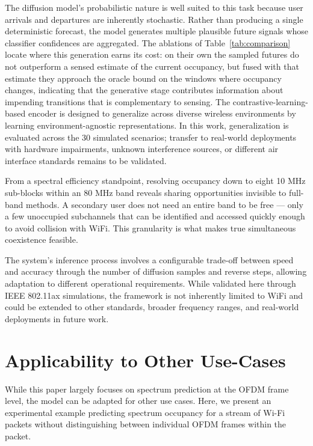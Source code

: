 \documentclass[lettersize,journal]{IEEEtran}
\begin{document}
The diffusion model's probabilistic nature is well suited to this task because user arrivals and departures are inherently stochastic. Rather than producing a single deterministic forecast, the model generates multiple plausible future signals whose classifier confidences are aggregated. The ablations of Table~\ref{tab:comparison} locate where this generation earns its cost: on their own the sampled futures do not outperform a sensed estimate of the current occupancy, but fused with that estimate they approach the oracle bound on the windows where occupancy changes, indicating that the generative stage contributes information about impending transitions that is complementary to sensing. The contrastive-learning-based encoder is designed to generalize across diverse wireless environments by learning environment-agnostic representations. In this work, generalization is evaluated across the 30 simulated scenarios; transfer to real-world deployments with hardware impairments, unknown interference sources, or different air interface standards remains to be validated.

From a spectral efficiency standpoint, resolving occupancy down to eight 10 MHz sub-blocks within an 80 MHz band reveals sharing opportunities invisible to full-band methods. A secondary user does not need an entire band to be free — only a few unoccupied subchannels that can be identified and accessed quickly enough to avoid collision with WiFi. This granularity is what makes true simultaneous coexistence feasible.

The system's inference process involves a configurable trade-off between speed and accuracy through the number of diffusion samples and reverse steps, allowing adaptation to different operational requirements. While validated here through IEEE 802.11ax simulations, the framework is not inherently limited to WiFi and could be extended to other standards, broader frequency ranges, and real-world deployments in future work.

\section{Applicability to Other Use-Cases}\label{sec:other_use_cases}

While this paper largely focuses on spectrum prediction at the OFDM frame level, the model can be adapted for other use cases. Here, we present an experimental example predicting spectrum occupancy for a stream of Wi-Fi packets without distinguishing between individual OFDM frames within the packet.
\end{document}

